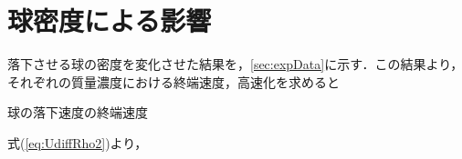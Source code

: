 \section{球密度による影響}


落下させる球の密度を変化させた結果を，\ref{sec:expData}に示す．この結果より，それぞれの質量濃度における終端速度，高速化を求めると

球の落下速度の終端速度

式(\ref{eq:UdiffRho2})より，
